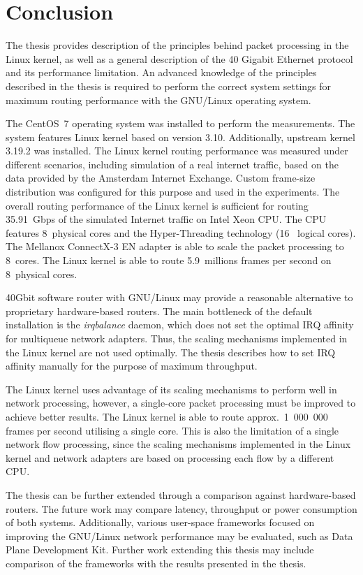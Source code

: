 
\chapter{Conclusion}\label{chap:conclusion}
The thesis provides description of the principles behind packet processing in the Linux kernel, as well as
a general description of the 40 Gigabit Ethernet protocol and its performance limitation.
An advanced knowledge of the principles described in the thesis is required to
perform the correct system settings for maximum routing performance with the GNU/Linux operating system.

The CentOS~7 operating system was installed to perform the measurements.
The system features Linux kernel based on version 3.10.
Additionally, upstream kernel 3.19.2 was installed.
The Linux kernel routing performance was measured under different scenarios, including
simulation of a real internet traffic, based on the data provided by the Amsterdam Internet Exchange.
Custom frame-size distribution was configured for this purpose and used in the experiments.
The overall routing performance of the Linux kernel is sufficient for routing 35.91~Gbps
of the simulated Internet traffic on Intel Xeon CPU.
The CPU features 8~physical cores and the Hyper-Threading technology (16~ logical cores).
The Mellanox ConnectX-3 EN adapter is able to scale the packet processing to 8~cores.%
The Linux kernel is able to route 5.9~millions frames per second on 8~physical cores.

40Gbit software router with GNU/Linux may provide a reasonable alternative to proprietary hardware-based routers.
The main bottleneck of the default installation is the {\it{irqbalance}} daemon, which
does not set the optimal IRQ affinity for multiqueue network adapters.
Thus, the scaling mechanisms implemented in the Linux kernel are not used optimally.
The thesis describes how to set IRQ affinity manually for the purpose of maximum throughput.

The Linux kernel uses advantage of its scaling mechanisms to perform well in network processing,
however, a single-core packet processing must be improved to achieve better results.
The Linux kernel is able to route approx.~1~000~000 %
frames per second utilising a single core.
This is also the limitation of a single network flow processing,
since the scaling mechanisms implemented in the Linux kernel and network adapters
are based on processing each flow by a different CPU.

The thesis can be further extended through a comparison against hardware-based routers.
The future work may compare latency, throughput or power consumption of both systems.
Additionally, various user-space frameworks focused on improving the GNU/Linux network performance may be evaluated,
such as Data Plane Development Kit.
Further work extending this thesis may include comparison of
the frameworks with the results presented in the thesis.
